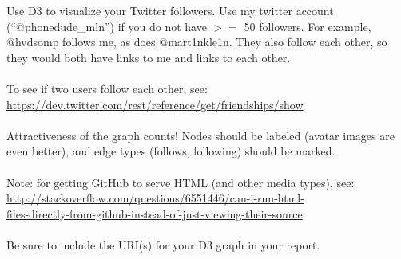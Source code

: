 Use D3 to visualize your Twitter followers.  Use my twitter account
(\enquote{{@}phonedude\_mln}) if you do not have $>=$ 50 followers.  For example,
{@}hvdsomp follows me, as does {@}mart1nkle1n.  They also follow each
other, so they would both have links to me and links to each other.\\
\\
To see if two users follow each other, see:\\
\url{https://dev.twitter.com/rest/reference/get/friendships/show}\\
\\
Attractiveness of the graph counts!  Nodes should be labeled (avatar
images are even better), and edge types (follows, following) should
be marked.\\
\\
Note: for getting GitHub to serve HTML (and other media types), see:\\
\url{http://stackoverflow.com/questions/6551446/can-i-run-html-}\\
\url{files-directly-from-github-instead-of-just-viewing-their-source}\\
\\
Be sure to include the URI(s) for your D3 graph in your report. 
